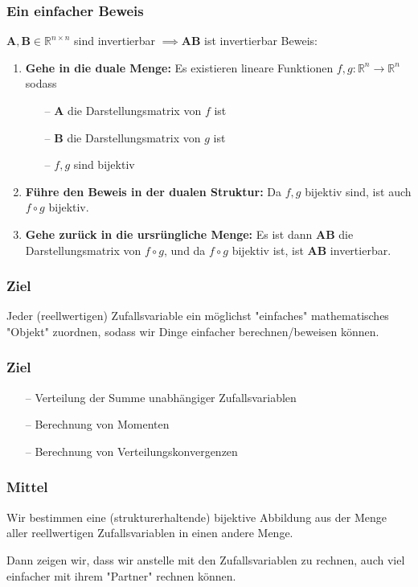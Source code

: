 \documentclass{beamer}
\newcommand{\R}{\mathbb{R}}
\newcommand{\A}{\mathbf{A}}
\newcommand{\B}{\mathbf{B}}
\begin{document}
\begin{frame}
\frametitle{Ein einfacher Beweis}
$\A, \B \in \R^{n \times n}$ sind invertierbar $\implies \A \B$ ist invertierbar
\hfill \break
\hfill \break
Beweis:
\begin{enumerate}
  \item \textbf{Gehe in die duale Menge:} \hfill \break
  Es existieren lineare Funktionen $f, g: \R^n \to \R^n$ sodass
  \begin{itemize}
    \item[--] $\A$ die Darstellungsmatrix von $f$ ist
    \item[--] $\B$ die Darstellungsmatrix von $g$ ist
    \item[--] $f, g$ sind bijektiv
  \end{itemize}
  \item \textbf{Führe den Beweis in der dualen Struktur:} \hfill \break
  Da $f, g$ bijektiv sind, ist auch $f \circ g$ bijektiv.
  \item \textbf{Gehe zurück in die ursrüngliche Menge:} \hfill \break
    Es ist dann $\A \B$ die Darstellungsmatrix von $f \circ g$, und     da $f \circ g$ bijektiv ist, ist $\A \B$ invertierbar.
\end{enumerate}


\end{frame}

\begin{frame}
\frametitle{Ziel}
Jeder (reellwertigen) Zufallsvariable ein möglichst "einfaches" mathematisches "Objekt" zuordnen, sodass wir Dinge einfacher berechnen/beweisen können.
\end{frame}

\begin{frame}
\frametitle{Ziel}
\begin{itemize}
    \setlength\itemsep{1em}
    \item[--] Verteilung der Summe unabhängiger Zufallsvariablen
    \item[--] Berechnung von Momenten
    \item[--] Berechnung von Verteilungskonvergenzen
\end{itemize}
\end{frame}

\begin{frame}
\frametitle{Mittel}
Wir bestimmen eine (strukturerhaltende) bijektive Abbildung aus der Menge aller reellwertigen Zufallsvariablen in einen andere Menge.

Dann zeigen wir, dass wir anstelle mit den Zufallsvariablen zu rechnen, auch viel einfacher mit ihrem "Partner" rechnen können.
\end{frame}
\end{document}
